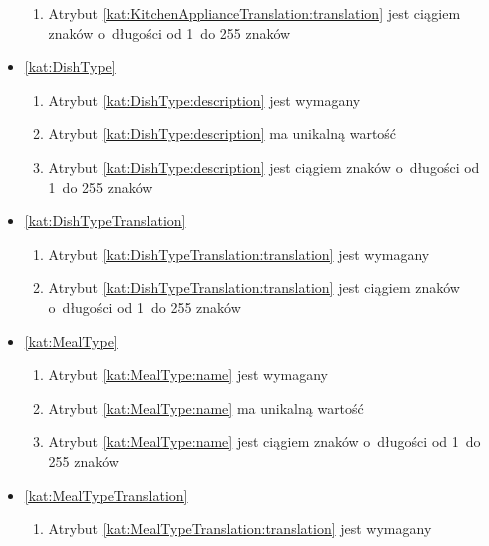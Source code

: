 \begin{itemize}[label={\textbf{Ograniczenia dla}}, wide, labelwidth=!, labelindent=0pt]
\begin{enumerate}[label={\textbf{OGR/\protect\threedigits{\arabic{enumi}}}}, wide, labelwidth=!, align=left, leftmargin=3cm, resume]
        \item Atrybut \ref{kat:KitchenApplianceTranslation:translation} jest ciągiem znaków o~długości od 1~do 255 znaków
    \end{enumerate}

    \item\ref{kat:DishType}
    \begin{enumerate}[label={\textbf{OGR/\protect\threedigits{\arabic{enumi}}}}, wide, labelwidth=!, align=left, leftmargin=3cm, resume]
        \item Atrybut \ref{kat:DishType:description} jest wymagany

        \item Atrybut \ref{kat:DishType:description} ma unikalną wartość

        \item Atrybut \ref{kat:DishType:description} jest ciągiem znaków o~długości od 1~do 255 znaków
    \end{enumerate}

    \item\ref{kat:DishTypeTranslation}
    \begin{enumerate}[label={\textbf{OGR/\protect\threedigits{\arabic{enumi}}}}, wide, labelwidth=!, align=left, leftmargin=3cm, resume]
        \item Atrybut \ref{kat:DishTypeTranslation:translation} jest wymagany

        \item Atrybut \ref{kat:DishTypeTranslation:translation} jest ciągiem znaków o~długości od 1~do 255 znaków
    \end{enumerate}

    \item\ref{kat:MealType}
    \begin{enumerate}[label={\textbf{OGR/\protect\threedigits{\arabic{enumi}}}}, wide, labelwidth=!, align=left, leftmargin=3cm, resume]
        \item Atrybut \ref{kat:MealType:name} jest wymagany

        \item Atrybut \ref{kat:MealType:name} ma unikalną wartość

        \item Atrybut \ref{kat:MealType:name} jest ciągiem znaków o~długości od 1~do 255 znaków
    \end{enumerate}

    \item\ref{kat:MealTypeTranslation}
    \begin{enumerate}[label={\textbf{OGR/\protect\threedigits{\arabic{enumi}}}}, wide, labelwidth=!, align=left, leftmargin=3cm, resume]
        \item Atrybut \ref{kat:MealTypeTranslation:translation} jest wymagany


\end{enumerate}
\end{itemize}

